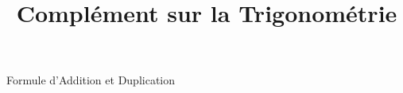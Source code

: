 \documentclass{cours}
\title{Complément sur la Trigonométrie}
\begin{document}

    \begin{Gpartie}{Formule d'Addition et Duplication} 
        
    \end{Gpartie}
\end{document}
